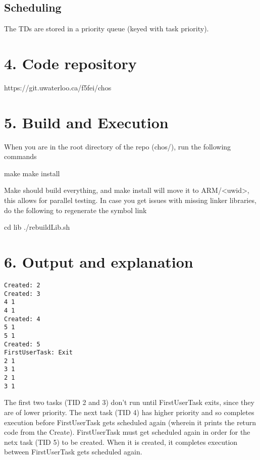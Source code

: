 \documentclass{article}
\begin{document}
\subsection*{Scheduling}

The TDs are stored in a priority queue (keyed with task priority).

\section*{4. Code repository}

https://git.uwaterloo.ca/f5fei/chos

\section*{5. Build and Execution}

When you are in the root directory of the repo (chos/), run the following commands

make
make install

Make should build everything, and make install will move it to ARM/<uwid>, this allows for parallel testing.
In case you get issues with missing linker libraries, do the following to regenerate the symbol link

cd lib
./rebuildLib.sh

\section*{6. Output and explanation}

\begin{verbatim}
Created: 2
Created: 3
4 1
4 1
Created: 4
5 1
5 1
Created: 5
FirstUserTask: Exit
2 1
3 1
2 1
3 1
\end{verbatim}

The first two tasks (TID 2 and 3) don't run until FirstUserTask exits, since they are of lower priority. The next task (TID 4) has higher priority and so completes execution before FirstUserTask gets scheduled again (wherein it prints the return code from the Create). FirstUserTask must get scheduled again in order for the netx task (TID 5) to be created. When it is created, it completes execution between FirstUserTask gets scheduled again.
\end{document}

